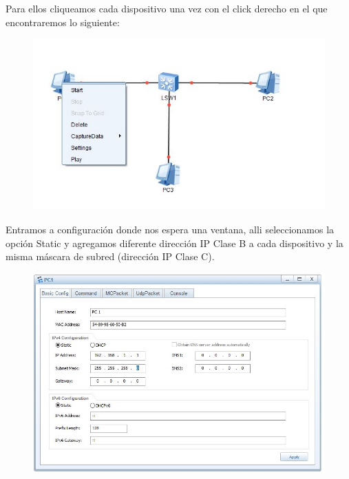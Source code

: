 \documentclass[journal]{IEEEtran}
\begin{document}
Para ellos cliqueamos cada dispositivo una vez con el click derecho en el que encontraremos lo siguiente:
\begin{center}
\begin{figure}[H]
\centering
\includegraphics[scale=0.5]{8.JPG} 
\end{figure}
\end{center}
Entramos a configuración donde nos espera una ventana, alli seleccionamos la opción Static y agregamos diferente dirección IP Clase B a cada dispositivo y la misma máscara de subred (dirección IP Clase C).
\begin{center}
\begin{figure}[H]
\centering
\includegraphics[scale=0.42]{9.JPG} 
\end{figure}
\end{center}
\end{document}
